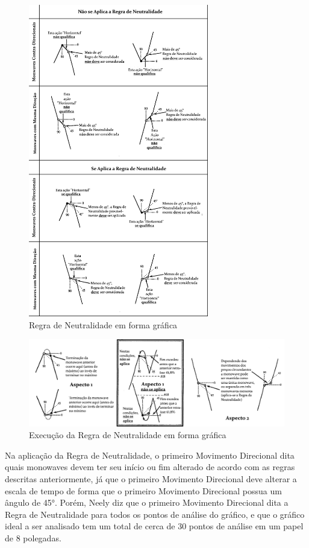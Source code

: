 \documentclass[12pt]{article}
\begin{document}
\begin{figure}[H]
	\centering
	\includegraphics[width=0.7\textwidth]{RuleOfNeutralityCheck.png}
	\caption{Regra de Neutralidade em forma gráfica}\label{fig:RuleOfNeutralityCheck}
\end{figure}

\begin{figure}[H]
	\centering
	\includegraphics[width=\textwidth]{RuleOfNeutralityExecution.png}
	\caption{Execução da Regra de Neutralidade em forma gráfica}
	\label{fig:RuleOfNeutralityExecution}
\end{figure}

Na aplicação da Regra de Neutralidade, o primeiro Movimento Direcional dita quais monowaves
devem ter seu início ou fim alterado de acordo com as regras descritas anteriormente,
já que o primeiro Movimento Direcional deve alterar a escala de tempo de forma que o
primeiro Movimento Direcional possua um ângulo de \ang{45}.
Porém, Neely diz que o primeiro Movimento Direcional dita a Regra de Neutralidade para
todos os pontos de análise do gráfico, e que o gráfico ideal a ser analisado tem um total
de cerca de 30 pontos de análise em um papel de 8 polegadas.
\end{document}
